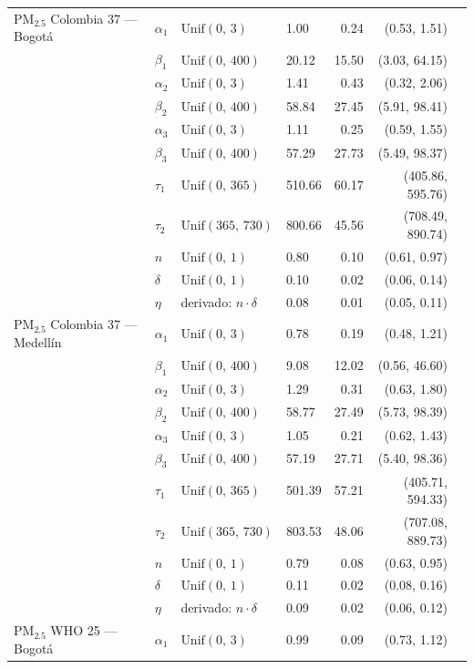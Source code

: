 \begin{longtable}{llllrrr}
PM$_{2.5}$ Colombia 37 --- Bogot\'{a} & $\alpha_{1}$ & $\text{Unif}(0,\,3)$ & 1.00 & 0.24 & (0.53, 1.51) \\
 & $\beta_{1}$ & $\text{Unif}(0,\,400)$ & 20.12 & 15.50 & (3.03, 64.15) \\
 & $\alpha_{2}$ & $\text{Unif}(0,\,3)$ & 1.41 & 0.43 & (0.32, 2.06) \\
 & $\beta_{2}$ & $\text{Unif}(0,\,400)$ & 58.84 & 27.45 & (5.91, 98.41) \\
 & $\alpha_{3}$ & $\text{Unif}(0,\,3)$ & 1.11 & 0.25 & (0.59, 1.55) \\
 & $\beta_{3}$ & $\text{Unif}(0,\,400)$ & 57.29 & 27.73 & (5.49, 98.37) \\
 & $\tau_{1}$ & $\text{Unif}(0,\,365)$ & 510.66 & 60.17 & (405.86, 595.76) \\
 & $\tau_{2}$ & $\text{Unif}(365,\,730)$ & 800.66 & 45.56 & (708.49, 890.74) \\
 & $n$ & $\text{Unif}(0,\,1)$ & 0.80 & 0.10 & (0.61, 0.97) \\
 & $\delta$ & $\text{Unif}(0,\,1)$ & 0.10 & 0.02 & (0.06, 0.14) \\
 & $\eta$ & derivado: $n \cdot \delta$ & 0.08 & 0.01 & (0.05, 0.11) \\
\midrule
PM$_{2.5}$ Colombia 37 --- Medell\'{i}n & $\alpha_{1}$ & $\text{Unif}(0,\,3)$ & 0.78 & 0.19 & (0.48, 1.21) \\
 & $\beta_{1}$ & $\text{Unif}(0,\,400)$ & 9.08 & 12.02 & (0.56, 46.60) \\
 & $\alpha_{2}$ & $\text{Unif}(0,\,3)$ & 1.29 & 0.31 & (0.63, 1.80) \\
 & $\beta_{2}$ & $\text{Unif}(0,\,400)$ & 58.77 & 27.49 & (5.73, 98.39) \\
 & $\alpha_{3}$ & $\text{Unif}(0,\,3)$ & 1.05 & 0.21 & (0.62, 1.43) \\
 & $\beta_{3}$ & $\text{Unif}(0,\,400)$ & 57.19 & 27.71 & (5.40, 98.36) \\
 & $\tau_{1}$ & $\text{Unif}(0,\,365)$ & 501.39 & 57.21 & (405.71, 594.33) \\
 & $\tau_{2}$ & $\text{Unif}(365,\,730)$ & 803.53 & 48.06 & (707.08, 889.73) \\
 & $n$ & $\text{Unif}(0,\,1)$ & 0.79 & 0.08 & (0.63, 0.95) \\
 & $\delta$ & $\text{Unif}(0,\,1)$ & 0.11 & 0.02 & (0.08, 0.16) \\
 & $\eta$ & derivado: $n \cdot \delta$ & 0.09 & 0.02 & (0.06, 0.12) \\
\midrule
PM$_{2.5}$ WHO 25 --- Bogot\'{a} & $\alpha_{1}$ & $\text{Unif}(0,\,3)$ & 0.99 & 0.09 & (0.73, 1.12) \\

\end{longtable}
